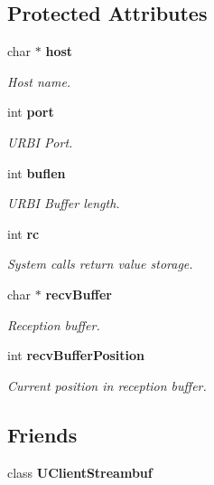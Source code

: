 \subsection*{Protected Attributes}
\begin{CompactItemize}
\item 
char $\ast$ {\bf host}\label{classUAbstractClient_p0}

\begin{CompactList}\small\item\em Host name. \item\end{CompactList}\item 
int {\bf port}\label{classUAbstractClient_p1}

\begin{CompactList}\small\item\em URBI Port. \item\end{CompactList}\item 
int {\bf buflen}\label{classUAbstractClient_p2}

\begin{CompactList}\small\item\em URBI Buffer length. \item\end{CompactList}\item 
int {\bf rc}\label{classUAbstractClient_p3}

\begin{CompactList}\small\item\em System calls return value storage. \item\end{CompactList}\item 
char $\ast$ {\bf recv\-Buffer}\label{classUAbstractClient_p4}

\begin{CompactList}\small\item\em Reception buffer. \item\end{CompactList}\item 
int {\bf recv\-Buffer\-Position}\label{classUAbstractClient_p5}

\begin{CompactList}\small\item\em Current position in reception buffer. \item\end{CompactList}\end{CompactItemize}
\subsection*{Friends}
\begin{CompactItemize}
\item 
class {\bf UClient\-Streambuf}\label{classUAbstractClient_n0}

\end{CompactItemize}


